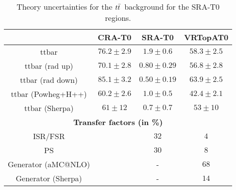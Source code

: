 \begin{description}
 \begin{table}[!h]
    \begin{center} \footnotesize
      \begin{tabular}{|c|c|c|c|}
        \hline
        & CRA-T0 & SRA-T0 & VRTopAT0\\
        \hline
        ttbar&   $76.2\pm 2.9 $&         $1.9\pm 0.6 $&          $58.3\pm 2.5 $\\
        ttbar (rad up)&          $70.1\pm 2.8 $&         $0.80\pm 0.29 $&        $56.8\pm 2.8 $\\
        ttbar (rad down)&        $85.1\pm 3.2 $&         $0.50\pm 0.19 $&        $63.9\pm 2.5 $\\
        ttbar (Powheg+H++)&      $60.2\pm 2.6 $&         $1.0\pm 0.5 $&          $42.4\pm 2.1 $\\
        ttbar (Sherpa)&          $61\pm 12 $&    $0.7\pm 0.7 $&          $53\pm 10 $\\     
        \hline
        \multicolumn{4}{c}{\bf Transfer factors (in \%)} \\ \hline
        ISR/FSR &     &   $32$&   $4$\\
        PS &  &      $30$&   $8$\\
        Generator (aMC@NLO) & & - & $68$\\
        Generator (Sherpa) & & - & $14$\\        
        \hline       
        \end{tabular}
    \end{center}
    \caption{Theory uncertainties for the $t\bar{t}$\ background for the SRA-T0 regions.}
    \label{tab:ttbar_unc_SRA_T0}
  \end{table}


\end{description}
